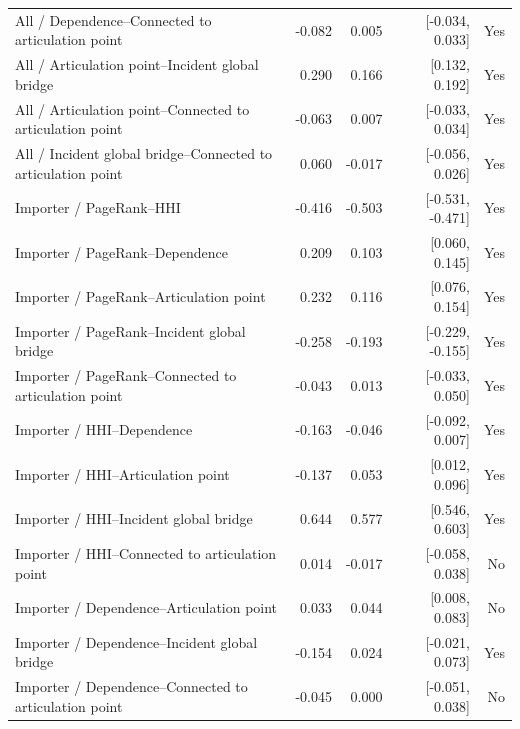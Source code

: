 \documentclass[pdftex,12pt,openright,a4paper,oneside]{book}
\begin{document}
\begin{longtable}{@{}p{}rrrr@{}}
All / Dependence--Connected to articulation point & -0.082 & 0.005 & [-0.034, 0.033] & Yes \\

All / Articulation point--Incident global bridge & 0.290 & 0.166 & [0.132, 0.192] & Yes \\

All / Articulation point--Connected to articulation point & -0.063 & 0.007 & [-0.033, 0.034] & Yes \\

All / Incident global bridge--Connected to articulation point & 0.060 & -0.017 & [-0.056, 0.026] & Yes \\

Importer / PageRank--HHI & -0.416 & -0.503 & [-0.531, -0.471] & Yes \\

Importer / PageRank--Dependence & 0.209 & 0.103 & [0.060, 0.145] & Yes \\

Importer / PageRank--Articulation point & 0.232 & 0.116 & [0.076, 0.154] & Yes \\

Importer / PageRank--Incident global bridge & -0.258 & -0.193 & [-0.229, -0.155] & Yes \\

Importer / PageRank--Connected to articulation point & -0.043 & 0.013 & [-0.033, 0.050] & Yes \\

Importer / HHI--Dependence & -0.163 & -0.046 & [-0.092, 0.007] & Yes \\

Importer / HHI--Articulation point & -0.137 & 0.053 & [0.012, 0.096] & Yes \\

Importer / HHI--Incident global bridge & 0.644 & 0.577 & [0.546, 0.603] & Yes \\

Importer / HHI--Connected to articulation point & 0.014 & -0.017 & [-0.058, 0.038] & No \\

Importer / Dependence--Articulation point & 0.033 & 0.044 & [0.008, 0.083] & No \\

Importer / Dependence--Incident global bridge & -0.154 & 0.024 & [-0.021, 0.073] & Yes \\

Importer / Dependence--Connected to articulation point & -0.045 & 0.000 & [-0.051, 0.038] & No \\


\end{longtable}
\end{document}
